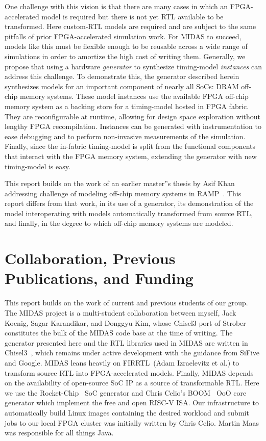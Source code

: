 One challenge with this vision is that there are many cases in which an
FPGA-accelerated model is required but there is not yet RTL available to be
transformed. Here custom-RTL models are required and are subject to the same
pitfalls of prior FPGA-accelerated simulation work. For MIDAS to
succeed, models like this must be flexible enough to be reusable across a wide
range of simulations in order to amortize the high cost of writing them.
Generally, we propose that using a hardware \emph{generator} to synthesize
timing-model \emph{instances} can address this challenge. To demonstrate this, the
generator described herein synthesizes models for an important component of
nearly all SoCs: DRAM off-chip memory systems. These model instances use the
available FPGA off-chip memory system as a backing store for a timing-model
hosted in FPGA fabric. They are reconfigurable at runtime, allowing for
design space exploration without lengthy FPGA recompilation. Instances can be
generated with instrumentation to ease debugging and to perform non-invasive
measurements of the simulation. Finally, since the in-fabric timing-model is
split from the functional components that interact with the FPGA memory system,
extending the generator with new timing-model is easy.

This report builds on the work of an earlier master''s thesis by Asif
Khan~\cite{khanmasters} addressing challenge of modeling off-chip memory
systems in RAMP~\cite{ramp}. This report differs from that work, in its use of
a generator, its demonstration of the model interoperating with models
automatically transformed from source RTL, and finally, in the degree to which
off-chip memory systems are modeled.

\section{Collaboration, Previous Publications, and Funding}

This report builds on the work of current and previous students of our group.
The MIDAS project is a multi-student collaboration between myself, Jack Koenig,
Sagar Karandikar, and Donggyu Kim, whose Chisel3 port of Strober~\cite{strober}
constitutes the bulk of the MIDAS code base at the time of writing. The
generator presented here and the RTL libraries used in MIDAS are written in
Chisel3~\cite{chisel}, which remains under active development with the guidance
from SiFive and Google. MIDAS leans heavily on FIRRTL~\cite{firrtl}(Adam
Izraelevitz et al.) to transform source RTL into FPGA-accelerated models.
Finally, MIDAS depends on the availability of open-source SoC IP as a source of
transformable RTL. Here we use the Rocket-Chip~\cite{rocketchip} SoC generator
and Chris Celio's BOOM~\cite{boom} OoO core generator which implement the free
and open RISC-V ISA.  Our infrastructure to automatically build Linux images
containing the desired workload and submit jobs to our local FPGA cluster was
initially written by Chris Celio. Martin Maas was responsible for all things
Java.

